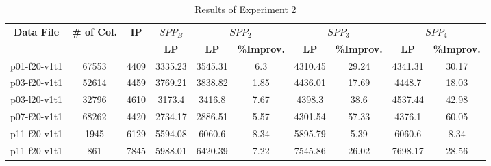 \begin{table}
\centering
\caption{Results of Experiment 2}\label{part1:lpbounds-gr2}
\begin {tabular}[t]{|c|c|c|c|c|c|c|c|c|c|}  
\hline
{\bf Data File} & {\bf \# of Col.} & {\bf IP} & {\bf $SPP_B$}& \multicolumn{2}{|c|}{{\bf $SPP_2$}} & \multicolumn{2}{|c|}{{\bf $SPP_3$}} & \multicolumn{2}{|c|}{{\bf $SPP_4$}}\\ \cline {4-10}
\mbox{} &  \mbox{} &  \mbox{} &  {\bf LP} & {\bf LP} & {\bf \%Improv.} & {\bf LP} & {\bf \%Improv.} & {\bf LP} & {\bf \%Improv.} \\\hline
p01-f20-v1t1	&	67553	&	4409	&	3335.23		& 3545.31	& 6.3 & 4310.45 & 29.24	& 4341.31	& 30.17	\\
p03-f20-v1t1	&	52614	&	4459	&	3769.21		&	3838.82	&	1.85	&	4436.01	&	17.69	&	4448.7	&	18.03	\\
p03-l20-v1t1	&	32796	&	4610	&	3173.4		&	3416.8	&	7.67	&	4398.3	&	38.6	&	4537.44	&	42.98	\\
p07-f20-v1t1	&	68262	&	4420	&	2734.17		&	2886.51	&	5.57	&	4301.54	&	57.33	&	4376.1	&	60.05	\\
p11-f20-v1t1	&	1945	&	6129	&	5594.08		&	6060.6	&	8.34	&	5895.79	&	5.39	&	6060.6	&	8.34	\\
p11-f20-v1t1	&	861	&	7845	&	5988.01		&	6420.39	&	7.22	&	7545.86	&	26.02	&	7698.17	&	28.56	\\\hline
\end{tabular}
\end{table}


